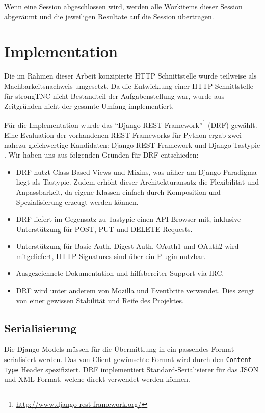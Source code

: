 Wenn eine Session abgeschlossen wird, werden alle Workitems dieser Session
abgeräumt und die jeweiligen Resultate auf die Session übertragen.

\section{Implementation}

Die im Rahmen dieser Arbeit konzipierte HTTP Schnittstelle wurde teilweise als
Machbarkeitsnachweis umgesetzt. Da die Entwicklung einer HTTP Schnittstelle für
strongTNC nicht Bestandteil der Aufgabenstellung war, wurde aus Zeitgründen
nicht der gesamte Umfang implementiert.

Für die Implementation wurde das \enquote{Django REST
Framework}\footnote{\url{http://www.django-rest-framework.org/}} (DRF) gewählt.
Eine Evaluation der vorhandenen REST Frameworks für Python ergab zwei nahezu
gleichwertige Kandidaten: Django REST Framework und Django-Tastypie
\cite{greenfeld2012rest}. Wir haben uns aus folgenden Gründen für DRF
entschieden:

\begin{itemize}
	\item DRF nutzt Class Based Views und Mixins, was näher am Django-Paradigma
		liegt als Tastypie. Zudem erhöht dieser Architekturansatz die Flexibilität
		und Anpassbarkeit, da eigene Klassen einfach durch Komposition und
		Spezialisierung erzeugt werden können.
	\item DRF liefert im Gegensatz zu Tastypie einen API Browser mit, inklusive
		Unterstützung für POST, PUT und DELETE Requests.
	\item Unterstützung für Basic Auth, Digest Auth, OAuth1 und OAuth2 wird
		mitgeliefert, HTTP Signatures sind über ein Plugin nutzbar.
	\item Ausgezeichnete Dokumentation und hilfsbereiter Support via IRC.
	\item DRF wird unter anderem von Mozilla und Eventbrite verwendet. Dies zeugt
		von einer gewissen Stabilität und Reife des Projektes.
\end{itemize}

\subsection{Serialisierung}
\label{api:serialisierung}
Die Django Models müssen für die Übermittlung in ein passendes Format
serialisiert werden. Das von Client gewünschte Format wird durch den
\texttt{Content-Type} Header spezifiziert. DRF implementiert
Standard-Serialisierer für das JSON und XML Format, welche direkt verwendet
werden können.

